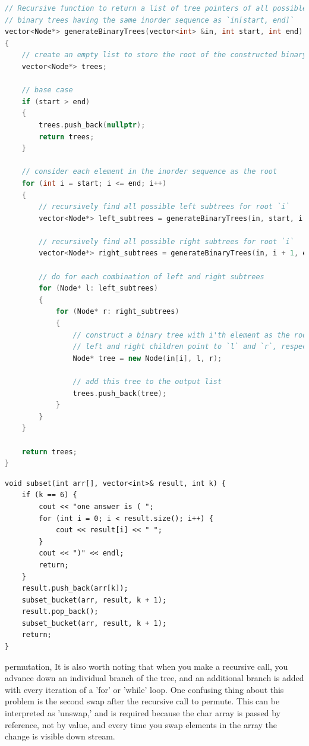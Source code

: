 \documentclass[a4paper,11pt,twoside]{book}
\begin{document}
\begin{lstlisting}[frame=single, language=c++]
// Recursive function to return a list of tree pointers of all possible
// binary trees having the same inorder sequence as `in[start, end]`
vector<Node*> generateBinaryTrees(vector<int> &in, int start, int end)
{
	// create an empty list to store the root of the constructed binary trees
	vector<Node*> trees;
	
	// base case
	if (start > end)
	{
		trees.push_back(nullptr);
		return trees;
	}
	
	// consider each element in the inorder sequence as the root
	for (int i = start; i <= end; i++)
	{
		// recursively find all possible left subtrees for root `i`
		vector<Node*> left_subtrees = generateBinaryTrees(in, start, i - 1);
		
		// recursively find all possible right subtrees for root `i`
		vector<Node*> right_subtrees = generateBinaryTrees(in, i + 1, end);
		
		// do for each combination of left and right subtrees
		for (Node* l: left_subtrees)
		{
			for (Node* r: right_subtrees)
			{
				// construct a binary tree with i'th element as the root and whose
				// left and right children point to `l` and `r`, respectively
				Node* tree = new Node(in[i], l, r);
				
				// add this tree to the output list
				trees.push_back(tree);
			}
		}
	}
	
	return trees;
}	
\end{lstlisting}	
	
	
	
\begin{lstlisting}
void subset(int arr[], vector<int>& result, int k) {
	if (k == 6) {
		cout << "one answer is ( ";
		for (int i = 0; i < result.size(); i++) {
			cout << result[i] << " ";
		}
		cout << ")" << endl;
		return;
	}
	result.push_back(arr[k]);
	subset_bucket(arr, result, k + 1);
	result.pop_back();
	subset_bucket(arr, result, k + 1);
	return;
}	
\end{lstlisting}

	\par permutation, It is also worth noting that when you make a recursive call, you advance down an individual branch of the tree, and an additional branch is added with every iteration of a 'for' or 'while' loop. One confusing thing about this problem is the second swap after the recursive call to permute. This can be interpreted as 'unswap,' and is required because the char array is passed by reference, not by value, and every time you swap elements in the array the change is visible down stream.
\end{document}
